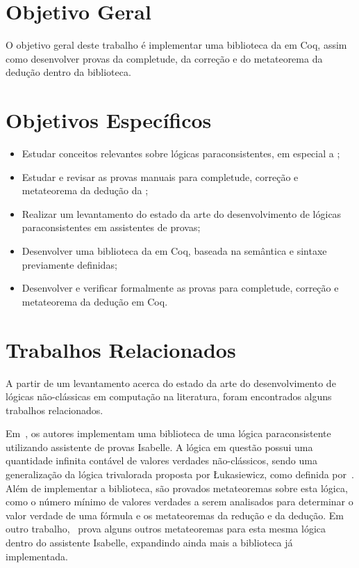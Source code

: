     \section{Objetivo Geral}
        O objetivo geral deste trabalho é implementar uma biblioteca da \lfium{} em Coq, assim como desenvolver provas da completude, da correção e do metateorema da dedução dentro da biblioteca.


    \section{Objetivos Específicos}
        \begin{itemize}
            \item Estudar conceitos relevantes sobre lógicas paraconsistentes, em especial a \lfium{};
            \item Estudar e revisar as provas manuais para completude, correção e metateorema da dedução da \lfium{};
            \item Realizar um levantamento do estado da arte do desenvolvimento de lógicas paraconsistentes em assistentes de provas;
            \item Desenvolver uma biblioteca da \lfium{} em Coq, baseada na semântica e sintaxe previamente definidas;
            \item Desenvolver e verificar formalmente as provas para completude, correção e metateorema da dedução em Coq.
        \end{itemize}


    \section{Trabalhos Relacionados}
        A partir de um levantamento acerca do estado da arte do desenvolvimento de lógicas não-clássicas em computação na literatura, foram encontrados alguns trabalhos relacionados.
    
        Em~\cite{Villadsen2017}, os autores implementam uma biblioteca de uma lógica paraconsistente utilizando assistente de provas Isabelle. A lógica em questão possui uma quantidade infinita contável de valores verdades não-clássicos, sendo uma generalização da lógica trivalorada proposta por {\L}ukasiewicz, como definida por~. Além de implementar a biblioteca, são provados metateoremas sobre esta lógica, como o número mínimo de valores verdades a serem analisados para determinar o valor verdade de uma fórmula e os metateoremas da redução e da dedução. Em outro trabalho,~ prova alguns outros metateoremas para esta mesma lógica dentro do assistente Isabelle, expandindo ainda mais a biblioteca já implementada.

